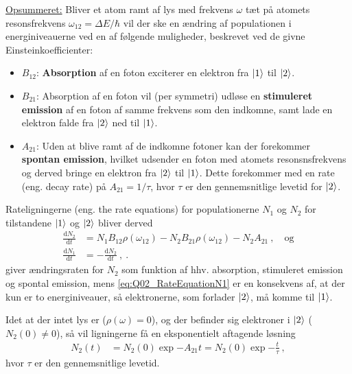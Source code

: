 \underline{Opsummeret:} Bliver et atom ramt af lys med frekvens $\omega$ tæt på atomets resonsfrekvens $\omega_{12} = \Delta E / \hbar$ vil der ske en ændring af populationen i energiniveauerne ved en af følgende muligheder, beskrevet ved de givne Einsteinkoefficienter:
\begin{itemize}
    \item $B_{12}$: \textbf{Absorption} af en foton exciterer en elektron fra $\ket{1}$ til $\ket{2}$.
    \item $B_{21}$: Absorption af en foton vil (per symmetri) udløse en \textbf{stimuleret emission} af en foton af samme frekvens som den indkomne, samt lade en elektron falde fra $\ket{2}$ ned til $\ket{1}$.
    \item $A_{21}$: Uden at blive ramt af de indkomne fotoner kan der forekommer \textbf{spontan emission}, hvilket udsender en foton med atomets resonsnsfrekvens og derved bringe en elektron fra $\ket{2}$ til $\ket{1}$. Dette forekommer med en rate (eng. decay rate) på $A_{21} = 1/\tau$, hvor $\tau$ er den gennemsnitlige levetid for $\ket{2}$.
\end{itemize}

Rateligningerne (eng. the rate equations) for populationerne $N_1$ og $N_2$ for tilstandene $\ket{1}$ og $\ket{2}$ bliver derved
\begin{align}
    \frac{\text{d}N_2}{\text{d}t} &= N_1 B_{12} \rho(\omega_{12}) - N_2 B_{21} \rho(\omega_{12}) - N_2 A_{21} \: , \quad \text{og} \label{eq:Q02_RateEquationN2}\\
    \frac{\text{d}N_1}{\text{d}t} &= - \frac{\text{d}N_2}{\text{d}t} \: , \label{eq:Q02_RateEquationN1} \: .
\end{align}
 giver ændringsraten for $N_2$ som funktion af hhv. absorption, stimuleret emission og spontal emission, mens \cref{eq:Q02_RateEquationN1} er en konsekvens af, at der kun er to energiniveauer, så elektronerne, som forlader $\ket{2}$, må komme til $\ket{1}$.

Idet at der intet lys er ($\rho(\omega) = 0$), og der befinder sig elektroner i $\ket{2}$ ($N_2(0) \ne 0$), så vil ligningerne få en eksponentielt aftagende løsning
\begin{align}
    N_2(t) &= N_2(0)\exp{-A_{21}t} = N_2(0)\exp{-\frac{t}{\tau}} \: ,
\end{align}
hvor $\tau$ er den gennemsnitlige levetid.


